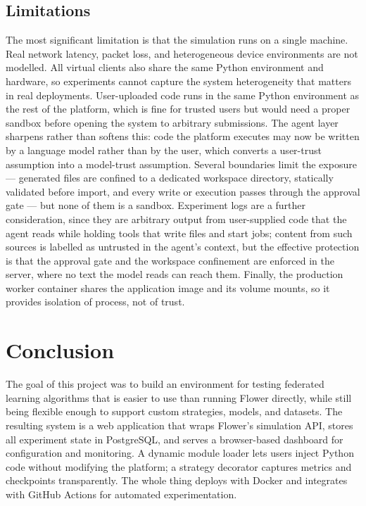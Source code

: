 \documentclass[conference]{IEEEtran}
\begin{document}
\subsection{Limitations}

The most significant limitation is that the simulation runs on a
single machine.
Real network latency, packet loss, and heterogeneous device environments
are not modelled.
All virtual clients also share the same Python environment and hardware,
so experiments cannot capture the system heterogeneity that matters in
real deployments.
User-uploaded code runs in the same Python environment as the rest of
the platform, which is fine for trusted users but would need a proper
sandbox before opening the system to arbitrary submissions.
The agent layer sharpens rather than softens this: code the platform
executes may now be written by a language model rather than by the user,
which converts a user-trust assumption into a model-trust assumption.
Several boundaries limit the exposure --- generated files are confined to
a dedicated workspace directory, statically validated before import, and
every write or execution passes through the approval gate --- but none of
them is a sandbox.
Experiment logs are a further consideration, since they are arbitrary
output from user-supplied code that the agent reads while holding tools
that write files and start jobs; content from such sources is labelled as
untrusted in the agent's context, but the effective protection is that
the approval gate and the workspace confinement are enforced in the
server, where no text the model reads can reach them.
Finally, the production worker container shares the application image and
its volume mounts, so it provides isolation of process, not of trust.

\section{Conclusion}
\label{sec:conclusion}

The goal of this project was to build an environment for testing
federated learning algorithms that is easier to use than running
Flower directly, while still being flexible enough to support custom
strategies, models, and datasets.
The resulting system is a web application that wraps Flower's simulation
API, stores all experiment state in PostgreSQL, and serves a browser-based
dashboard for configuration and monitoring.
A dynamic module loader lets users inject Python code without modifying
the platform; a strategy decorator captures metrics and checkpoints
transparently.
The whole thing deploys with Docker and integrates with GitHub Actions
for automated experimentation.
\end{document}
